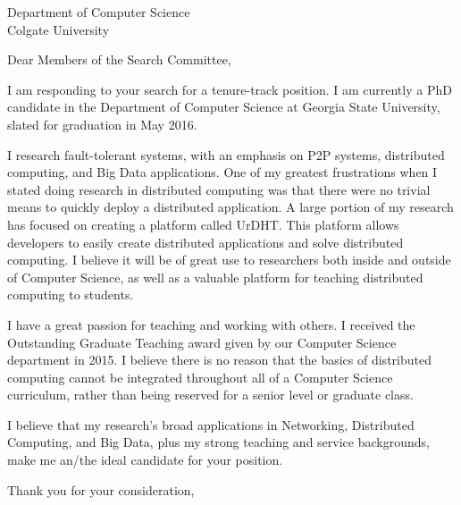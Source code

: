 \documentclass[12pt]{letter}
\date{}
\begin{document}
 
\begin{letter}{Department of Computer Science\\ Colgate University} 
\opening{Dear Members of the Search Committee,} 
 
I am responding to your search for a tenure-track position.
I am currently a PhD candidate in the Department of Computer Science at Georgia State University, slated for graduation in May 2016.


I research fault-tolerant systems, with an emphasis on P2P systems, distributed computing, and Big Data applications.
One of my greatest frustrations when I stated doing research in distributed computing was that there were no trivial means to quickly deploy a distributed application.
A large portion of my research has focused on creating a platform called UrDHT.
This platform allows developers to easily create distributed applications and solve distributed computing.
I believe it will be of great use to researchers both inside and outside of Computer Science, as well as a valuable platform for teaching distributed computing to students.

I have a great passion for teaching and working with others.
I received the Outstanding Graduate Teaching award given by our Computer Science department in 2015.
I believe there is no reason that the basics of distributed computing cannot be integrated throughout all of a Computer Science curriculum, rather than being  reserved for a senior level or graduate class.


I believe that my research's broad applications in Networking, Distributed Computing, and Big Data, plus my strong teaching and service backgrounds, make me an/the ideal candidate for your position.


\closing{Thank you for your consideration,} 
\end{letter} 
\end{document}
